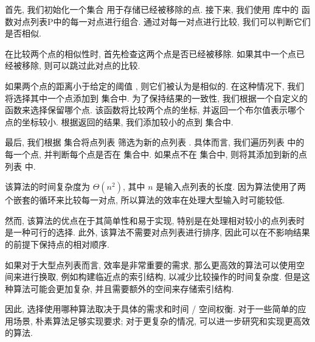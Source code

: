 首先, 我们初始化一个集合  用于存储已经被移除的点.
接下来, 我们使用  库中的  函数对点列表P中的每一对点进行组合.
通过对每一对点进行比较, 我们可以判断它们是否相似.

在比较两个点的相似性时, 首先检查这两个点是否已经被移除.
如果其中一个点已经被移除, 则可以跳过此对点的比较.

如果两个点的距离小于给定的阈值 , 则它们被认为是相似的.
在这种情况下, 我们将选择其中一个点添加到  集合中.
为了保持结果的一致性, 我们根据一个自定义的  函数来选择保留哪个点.
该函数将比较两个点的坐标, 并返回一个布尔值表示哪个点的坐标较小.
根据返回的结果, 我们添加较小的点到  集合中.

最后, 我们根据  集合将点列表  筛选为新的点列表 .
具体而言, 我们遍历列表  中的每一个点, 并判断每个点是否在  集合中.
如果点不在  集合中, 则将其添加到新的点列表  中.

该算法的时间复杂度为 $\Theta(n^2)$, 其中 $n$ 是输入点列表的长度.
因为算法使用了两个嵌套的循环来比较每一对点, 所以算法的效率在处理大型输入时可能较低.

然而, 该算法的优点在于其简单性和易于实现, 特别是在处理相对较小的点列表时是一种可行的选择.
此外, 该算法不需要对点列表进行排序, 因此可以在不影响结果的前提下保持点的相对顺序.

如果对于大型点列表而言, 效率是非常重要的需求, 那么更高效的算法可以使用空间来进行换取, 例如构建临近点的索引结构, 以减少比较操作的时间复杂度.
但是这种算法可能会更加复杂, 并且需要额外的空间来存储索引结构.

因此, 选择使用哪种算法取决于具体的需求和时间 / 空间权衡.
对于一些简单的应用场景, 朴素算法足够实现要求; 对于更复杂的情况, 可以进一步研究和实现更高效的算法.


